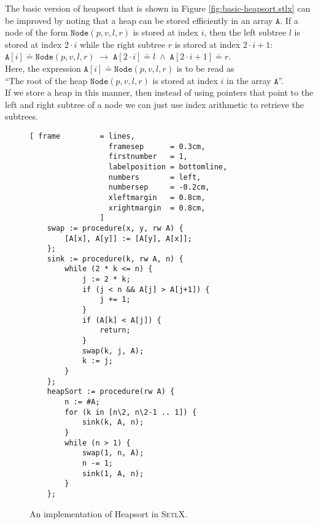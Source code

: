The basic version of heapsort that is shown in Figure \ref{fig:basic-heapsort.stlx} can be improved
by noting that a heap can be stored efficiently in an array $\mathtt{A}$.  If a node of the form
$\mathtt{Node}(p, v, l, r)$ is stored at index $i$, then the left subtree $l$ is stored at
index $2 \cdot i$ while the right subtree $r$ is stored at index $2 \cdot i + 1$:
\\[0.2cm]
\hspace*{1.3cm}
$\mathtt{A}[i] \doteq \mathtt{Node}(p, v, l, r) \;\rightarrow\; \mathtt{A}[2\cdot i] \doteq l \;\wedge\; \mathtt{A}[2\cdot i+1] \doteq r$.
\\[0.2cm]
Here, the expression $\mathtt{A}[i] \doteq \mathtt{Node}(p, v, l, r)$ is to be read as 
\\[0.2cm]
\hspace*{1.3cm}
``The root of the heap $\mathtt{Node}(p, v, l, r)$ is stored at index $i$ in the array $\mathtt{A}$''.
\\[0.2cm]
If we store a heap in this manner, then instead of using pointers that point to the left and right
subtree of a node we can just use index arithmetic to retrieve the subtrees.  


 
\begin{figure}[!ht]
\centering
\begin{Verbatim}[ frame         = lines, 
                  framesep      = 0.3cm, 
                  firstnumber   = 1,
                  labelposition = bottomline,
                  numbers       = left,
                  numbersep     = -0.2cm,
                  xleftmargin   = 0.8cm,
                  xrightmargin  = 0.8cm,
                ]
    swap := procedure(x, y, rw A) {
        [A[x], A[y]] := [A[y], A[x]];
    };
    sink := procedure(k, rw A, n) {
        while (2 * k <= n) {
            j := 2 * k;
            if (j < n && A[j] > A[j+1]) {
                j += 1;
            }
            if (A[k] < A[j]) {
                return;
            }
            swap(k, j, A);
            k := j;
        }
    };
    heapSort := procedure(rw A) {
        n := #A;
        for (k in [n\2, n\2-1 .. 1]) {
            sink(k, A, n);
        }
        while (n > 1) {
            swap(1, n, A);
            n -= 1;
            sink(1, A, n);
        }
    };
\end{Verbatim}
\vspace*{-0.3cm}
\caption{An implementation of Heapsort in \textsc{SetlX}.}
\label{fig:heap-sort.stlx}
\end{figure}

